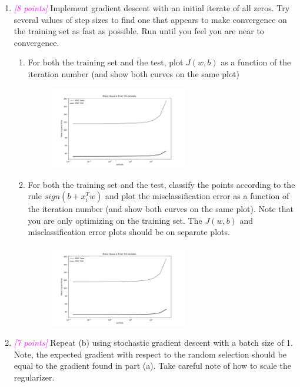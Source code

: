 \documentclass{article}
\newcommand{\1}{\mathbf{1}}
\newcommand{\points}[1]{\small\textcolor{magenta}{\emph{[#1 points]}} \normalsize}
\begin{document}
\begin{enumerate}
    
    \newpage
    \item \points{8} Implement gradient descent with an initial iterate of all zeros. Try several values of step sizes to find one that appears to make convergence on the training set as fast as possible. Run until you feel you are near to convergence.
    \begin{enumerate}
        \item For both the training set and the test, plot $J(w,b)$ as a function of the iteration number (and show both curves on the same plot) \\
        \begin{figure}[h!]
        \centering
            \includegraphics[width=0.6\textwidth]{HW2/HW2_plots/MSEA5.png}
        \end{figure}
        \item For both the training set and the test, classify the points according to the rule $sign(b+x^T_iw)$ and plot the misclassification error as a function of the iteration number (and show both curves on the same plot). Note that you are only optimizing on the training set. The $J(w,b)$ and misclassification error plots should be on separate plots.
        \begin{figure}[h!]
        \centering
            \includegraphics[width=0.6\textwidth]{HW2/HW2_plots/MSEA5.png}
        \end{figure}
    \end{enumerate}
    
    \newpage
    \item \points{7} Repeat (b) using stochastic gradient descent with a batch size of 1. Note, the expected gradient with respect to the random selection should be equal to the gradient found in part (a). Take careful note of how to scale the regularizer.
    

\end{enumerate}
\end{document}
